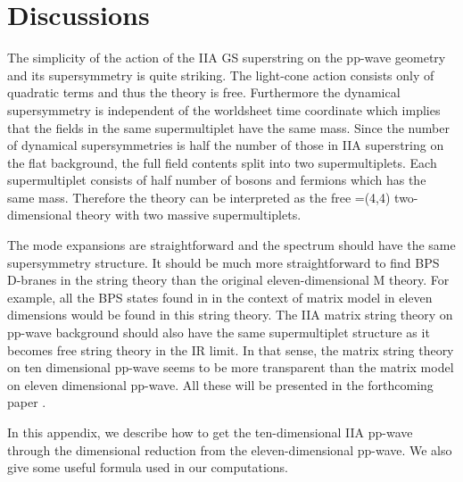 \documentclass[a4paper,12pt]{article}
\begin{document}
\section{Discussions}

The simplicity of the action of the IIA GS superstring on the pp-wave
geometry and its supersymmetry is quite striking. The light-cone
action consists only of quadratic terms and thus the theory is
free. Furthermore the dynamical supersymmetry is independent of the
worldsheet time coordinate which implies that the fields in the same
supermultiplet have the same mass.  Since the number of dynamical
supersymmetries is half the number of those in IIA superstring on the
flat background, the full field contents split into two
supermultiplets. Each supermultiplet consists of half number of bosons
and fermions which has the same mass. Therefore the theory can be
interpreted as the free \coordHE{}=(4,4) two-dimensional theory with
two massive supermultiplets.

The mode expansions are straightforward and the spectrum should have
the same supersymmetry structure.  It should be much more
straightforward to find BPS D-branes in the string theory
\cite{dab231,ske054,kns025,ak134,bis042} than the original
eleven-dimensional M theory. For example, all the BPS states found in
\cite{hyu090,bak033,ali237} in the context of matrix model in eleven
dimensions would be found in this string theory.  The IIA matrix
string theory on pp-wave background should also have the same
supermultiplet structure as it becomes free string theory in the IR
limit.  In that sense, the matrix string theory on ten dimensional
pp-wave seems to be more transparent than the matrix model on eleven
dimensional pp-wave.  All these will be presented in the forthcoming
paper \cite{hyuxxx}.




\vspace{12mm} 

\appendix\setcounter{section}{0} %
In this appendix, we describe how to get the ten-dimensional IIA
pp-wave through the dimensional reduction from the eleven-dimensional
pp-wave. We also give some useful formula used in our computations.
 
\end{document}
